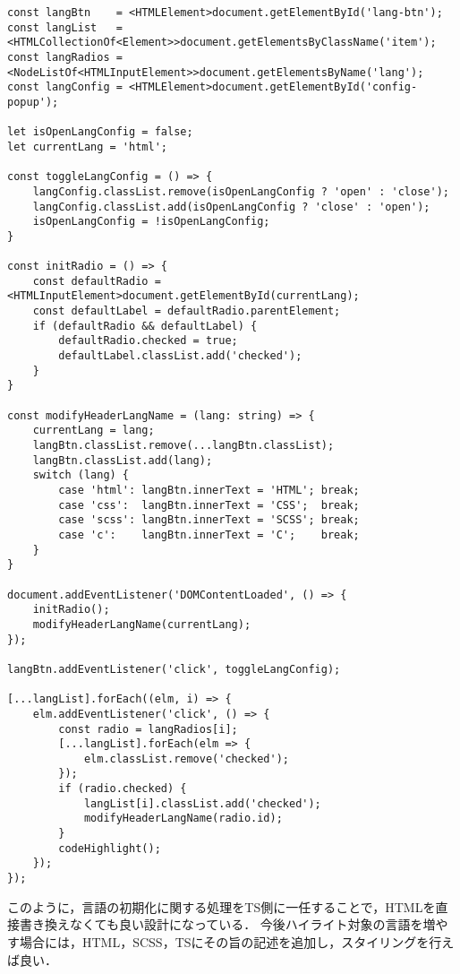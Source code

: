 \documentclass[autodetect-engine,dvi=dvipdfmx,ja=standard,
               a4j,11pt]{bxjsarticle}
\begin{document}
\begin{lstlisting}[caption={{\tt main.ts(ヘッダ制御部抜粋)}}, label={prog:head-ts}]
const langBtn    = <HTMLElement>document.getElementById('lang-btn');
const langList   = <HTMLCollectionOf<Element>>document.getElementsByClassName('item');
const langRadios = <NodeListOf<HTMLInputElement>>document.getElementsByName('lang');
const langConfig = <HTMLElement>document.getElementById('config-popup');

let isOpenLangConfig = false;
let currentLang = 'html';

const toggleLangConfig = () => {
    langConfig.classList.remove(isOpenLangConfig ? 'open' : 'close');
    langConfig.classList.add(isOpenLangConfig ? 'close' : 'open');
    isOpenLangConfig = !isOpenLangConfig;
}

const initRadio = () => {
    const defaultRadio = <HTMLInputElement>document.getElementById(currentLang);
    const defaultLabel = defaultRadio.parentElement;
    if (defaultRadio && defaultLabel) {
        defaultRadio.checked = true;
        defaultLabel.classList.add('checked');
    }
}

const modifyHeaderLangName = (lang: string) => {
    currentLang = lang;
    langBtn.classList.remove(...langBtn.classList);
    langBtn.classList.add(lang);
    switch (lang) {
        case 'html': langBtn.innerText = 'HTML'; break;
        case 'css':  langBtn.innerText = 'CSS';  break;
        case 'scss': langBtn.innerText = 'SCSS'; break;
        case 'c':    langBtn.innerText = 'C';    break;
    }
}

document.addEventListener('DOMContentLoaded', () => {
    initRadio();
    modifyHeaderLangName(currentLang);
});

langBtn.addEventListener('click', toggleLangConfig);

[...langList].forEach((elm, i) => {
    elm.addEventListener('click', () => {
        const radio = langRadios[i];
        [...langList].forEach(elm => {
            elm.classList.remove('checked');
        });
        if (radio.checked) {
            langList[i].classList.add('checked');
            modifyHeaderLangName(radio.id);
        }
        codeHighlight();
    });
});
\end{lstlisting}

このように，言語の初期化に関する処理をTS側に一任することで，HTMLを直接書き換えなくても良い設計になっている．
今後ハイライト対象の言語を増やす場合には，HTML，SCSS，TSにその旨の記述を追加し，スタイリングを行えば良い．
\end{document}
